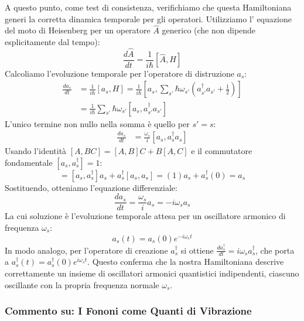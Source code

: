 A questo punto, come test di consistenza, verifichiamo che questa Hamiltoniana generi la corretta dinamica temporale per gli operatori. Utilizziamo l' equazione del moto di Heisenberg  per un operatore $\hat{A}$ generico (che non dipende esplicitamente dal tempo):
\begin{equation}
    \frac{d\hat{A}}{dt} = \frac{1}{i\hbar}[\hat{A}, H]
\end{equation}
Calcoliamo l'evoluzione temporale per l'operatore di distruzione $a_s$:
\begin{align*}
    \frac{da_s}{dt} &= \frac{1}{i\hbar}[a_s, H] = \frac{1}{i\hbar} \left[a_s, \sum_{s'} \hbar\omega_{s'} \left( a_{s'}^\dagger a_{s'} + \frac{1}{2} \right) \right] \\
    &= \frac{1}{i\hbar} \sum_{s'} \hbar\omega_{s'} [a_s, a_{s'}^\dagger a_{s'}]
\end{align*}
L'unico termine non nullo nella somma è quello per $s'=s$:
\begin{align*}
    \frac{da_s}{dt} &= \frac{\omega_s}{i} [a_s, a_s^\dagger a_s]
\end{align*}
Usando l'identità $[A,BC] = [A,B]C + B[A,C]$ e il commutatore fondamentale $[a_s, a_s^\dagger]=1$:
\begin{equation*}
    [a_s, a_s^\dagger a_s] = [a_s, a_s^\dagger]a_s + a_s^\dagger[a_s, a_s] = (1)a_s + a_s^\dagger(0) = a_s
\end{equation*}
Sostituendo, otteniamo l'equazione differenziale:
\begin{equation}
    \frac{da_s}{dt} = \frac{\omega_s}{i} a_s = -i\omega_s a_s
\end{equation}
La cui soluzione è l'evoluzione temporale attesa per un oscillatore armonico di frequenza $\omega_s$:
\begin{equation}
    a_s(t) = a_s(0) e^{-i\omega_s t}
\end{equation}
In modo analogo, per l'operatore di creazione $a_s^\dagger$ si ottiene $\frac{da_s^\dagger}{dt} = i\omega_s a_s^\dagger$, che porta a $a_s^\dagger(t) = a_s^\dagger(0) e^{i\omega_s t}$. Questo conferma che la nostra Hamiltoniana descrive correttamente un insieme di oscillatori armonici quantistici indipendenti, ciascuno oscillante con la propria frequenza normale $\omega_s$.




\subsubsection{Commento su: I Fononi come Quanti di Vibrazione}

